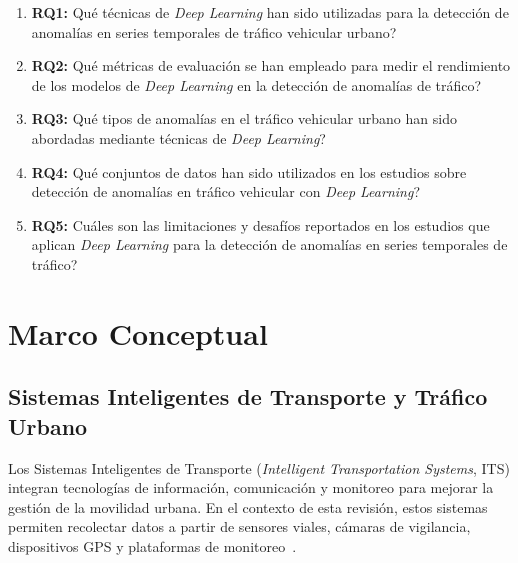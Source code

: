 \documentclass[12pt, a4paper]{article}
\begin{document}
\begin{preguntabox}
  \begin{enumerate}
    \item \textbf{RQ1:} \textquestiondown Qu\'{e} t\'{e}cnicas de \textit{Deep Learning} han sido utilizadas para la detecci\'{o}n de anomal\'{i}as en series temporales de tr\'{a}fico vehicular urbano?
    \item \textbf{RQ2:} \textquestiondown Qu\'{e} m\'{e}tricas de evaluaci\'{o}n se han empleado para medir el rendimiento de los modelos de \textit{Deep Learning} en la detecci\'{o}n de anomal\'{i}as de tr\'{a}fico?
    \item \textbf{RQ3:} \textquestiondown Qu\'{e} tipos de anomal\'{i}as en el tr\'{a}fico vehicular urbano han sido abordadas mediante t\'{e}cnicas de \textit{Deep Learning}?
    \item \textbf{RQ4:} \textquestiondown Qu\'{e} conjuntos de datos han sido utilizados en los estudios sobre detecci\'{o}n de anomal\'{i}as en tr\'{a}fico vehicular con \textit{Deep Learning}?
    \item \textbf{RQ5:} \textquestiondown Cu\'{a}les son las limitaciones y desaf\'{i}os reportados en los estudios que aplican \textit{Deep Learning} para la detecci\'{o}n de anomal\'{i}as en series temporales de tr\'{a}fico?
  \end{enumerate}
\end{preguntabox}

\section{Marco Conceptual}
\label{sec:marco}

\subsection{Sistemas Inteligentes de Transporte y Tr\'{a}fico Urbano}

Los Sistemas Inteligentes de Transporte (\textit{Intelligent Transportation Systems}, ITS) integran tecnolog\'{i}as de informaci\'{o}n, comunicaci\'{o}n y monitoreo para mejorar la gesti\'{o}n de la movilidad urbana. En el contexto de esta revisi\'{o}n, estos sistemas permiten recolectar datos a partir de sensores viales, c\'{a}maras de vigilancia, dispositivos GPS y plataformas de monitoreo~\cite{abdallah2025aipurban}.
\end{document}
